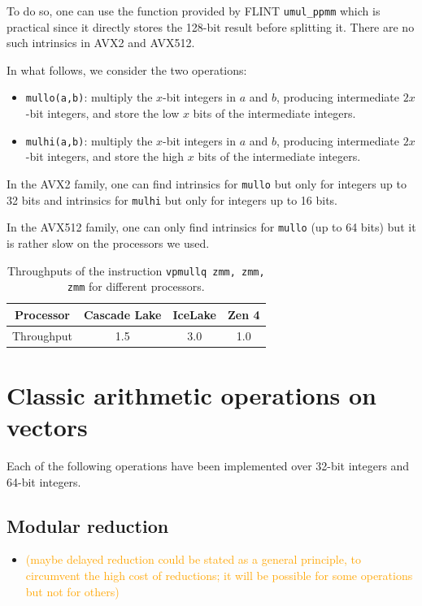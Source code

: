 \documentclass[a4paper]{article}
\begin{document}
To do so, one can use the function provided by FLINT \texttt{umul\_ppmm} which is practical since it directly stores the 128-bit result
before splitting it. There are no such intrinsics in AVX2 and AVX512.

In what follows, we consider the two operations:
\begin{itemize}
    \item \texttt{mullo(a,b)}: multiply the $x$-bit integers in $a$ and $b$, producing intermediate $2x$-bit integers, 
    and store the low $x$ bits of the intermediate integers.
    \item \texttt{mulhi(a,b)}: multiply the $x$-bit integers in $a$ and $b$, producing intermediate $2x$-bit integers, 
    and store the high $x$ bits of the intermediate integers.
\end{itemize}

In the AVX2 family, one can find intrinsics for \texttt{mullo} but only for integers up to 32 bits and intrinsics for 
\texttt{mulhi} but only for integers up to 16 bits.

In the AVX512 family, one can only find intrinsics for \texttt{mullo} (up to 64 bits) but it is rather slow on the processors we used.


\begin{table}[!h]
    \centering
    \begin{tabular}{|c|c|c|c|}
        \hline
        Processor & Cascade Lake & IceLake & Zen 4 \\
        \hline
        Throughput & 1.5 & 3.0 & 1.0 \\
        \hline
    \end{tabular}
    \caption{Throughputs of the instruction \texttt{vpmullq zmm, zmm, zmm} for different processors.}
\end{table}

\section{Classic arithmetic operations on vectors}

Each of the following operations have been implemented over 32-bit integers and 64-bit integers.

\subsection{Modular reduction}
\begin{itemize}
    \item \textcolor{orange}{(maybe delayed reduction could be stated as a general principle,
      to circumvent the high cost of reductions;
      it will be possible for some operations but not for others)}
\end{itemize}
\end{document}
